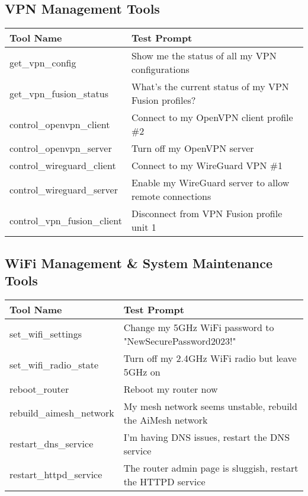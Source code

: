{\subsection*{VPN Management Tools}
\begin{tabular}{|p{6cm}|p{9cm}|}
\hline
\textbf{Tool Name} & \textbf{Test Prompt} \\
\hline
get\_vpn\_config & Show me the status of all my VPN configurations \\
\hline
get\_vpn\_fusion\_status & What's the current status of my VPN Fusion profiles? \\
\hline
control\_openvpn\_client & Connect to my OpenVPN client profile \#2 \\
\hline
control\_openvpn\_server & Turn off my OpenVPN server \\
\hline
control\_wireguard\_client & Connect to my WireGuard VPN \#1 \\
\hline
control\_wireguard\_server & Enable my WireGuard server to allow remote connections \\
\hline
control\_vpn\_fusion\_client & Disconnect from VPN Fusion profile unit 1 \\
\hline
\end{tabular}

\subsection*{WiFi Management \& System Maintenance Tools}
\begin{tabular}{|p{6cm}|p{9cm}|}
\hline
\textbf{Tool Name} & \textbf{Test Prompt} \\
\hline
set\_wifi\_settings & Change my 5GHz WiFi password to "NewSecurePassword2023!" \\
\hline
set\_wifi\_radio\_state & Turn off my 2.4GHz WiFi radio but leave 5GHz on \\
\hline
reboot\_router & Reboot my router now \\
\hline
rebuild\_aimesh\_network & My mesh network seems unstable, rebuild the AiMesh network \\
\hline
restart\_dns\_service & I'm having DNS issues, restart the DNS service \\
\hline
restart\_httpd\_service & The router admin page is sluggish, restart the HTTPD service \\
\hline
\end{tabular}

}
